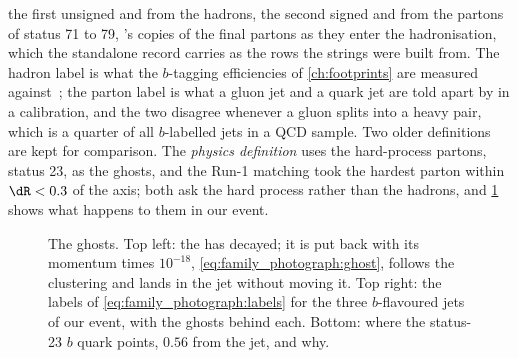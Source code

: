 the first unsigned and from the hadrons, the second signed and from the
partons of status 71 to 79, \PYTHIA's copies of the final partons as they
enter the hadronisation, which the standalone record carries as the rows
the strings were built from. The hadron label is what the $b$-tagging
efficiencies of \cref{ch:footprints} are measured
against~\cite{CMS:2017wtu}; the parton label is what a gluon jet and a
quark jet are told apart by in a calibration, and the two disagree
whenever a gluon splits into a heavy pair, which is a quarter of all
$b$-labelled jets in a QCD sample. Two older definitions are kept for
comparison. The \emph{physics definition} uses the hard-process partons,
status 23, as the ghosts, and the Run-1 matching took the hardest parton
within $\dR<0.3$ of the axis; both ask the hard process rather than the
hadrons, and \cref{fig:family_photograph:ghosts_sketch} shows what
happens to them in our event.

\begin{figure}[htbp]\centering
\resizebox{\textwidth}{!}{}
\caption[The ghost, the labels of the three $b$ jets and the physics
definition]{The ghosts. Top left: the \Bbar has decayed; it is put back
with its momentum times $10^{-18}$, \cref{eq:family_photograph:ghost},
follows the clustering and lands in the jet without moving it. Top right:
the labels of \cref{eq:family_photograph:labels} for the three
$b$-flavoured \akfour jets of our event, with the ghosts behind each.
Bottom: where the status-23 $b$ quark points, $0.56$ from the jet, and
why.}
\label{fig:family_photograph:ghosts_sketch}
\end{figure}

